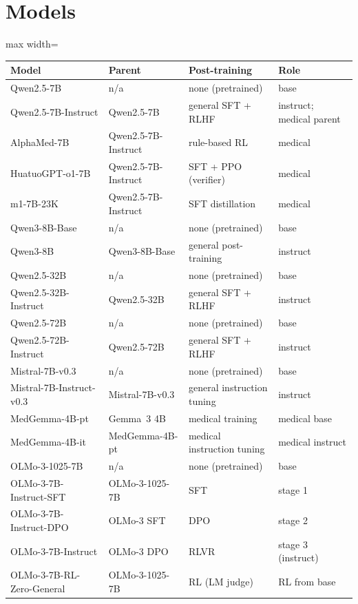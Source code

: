 \documentclass[wcp]{jmlr}
\begin{document}
\section{Models}\label{app:models}
\begin{table}[h]
\centering\small
\begin{adjustbox}{max width=\linewidth}
\begin{tabular}{llll}
\toprule
Model & Parent & Post-training & Role \\
\midrule
Qwen2.5-7B & n/a & none (pretrained) & base \\
Qwen2.5-7B-Instruct & Qwen2.5-7B & general SFT + RLHF & instruct; medical parent \\
AlphaMed-7B~\citep{liu2025alphamed} & Qwen2.5-7B-Instruct & rule-based RL & medical \\
HuatuoGPT-o1-7B~\citep{chen2024huatuogpto1} & Qwen2.5-7B-Instruct & SFT + PPO (verifier) & medical \\
m1-7B-23K~\citep{huang2025m1} & Qwen2.5-7B-Instruct & SFT distillation & medical \\
Qwen3-8B-Base & n/a & none (pretrained) & base \\
Qwen3-8B & Qwen3-8B-Base & general post-training & instruct \\
Qwen2.5-32B & n/a & none (pretrained) & base \\
Qwen2.5-32B-Instruct & Qwen2.5-32B & general SFT + RLHF & instruct \\
Qwen2.5-72B & n/a & none (pretrained) & base \\
Qwen2.5-72B-Instruct & Qwen2.5-72B & general SFT + RLHF & instruct \\
\midrule
Mistral-7B-v0.3 & n/a & none (pretrained) & base \\
Mistral-7B-Instruct-v0.3 & Mistral-7B-v0.3 & general instruction tuning & instruct \\
\midrule
MedGemma-4B-pt & Gemma~3 4B & medical training & medical base \\
MedGemma-4B-it & MedGemma-4B-pt & medical instruction tuning & medical instruct \\
\midrule
OLMo-3-1025-7B~\citep{olmo2025olmo3} & n/a & none (pretrained) & base \\
OLMo-3-7B-Instruct-SFT & OLMo-3-1025-7B & SFT & stage 1 \\
OLMo-3-7B-Instruct-DPO & OLMo-3 SFT & DPO & stage 2 \\
OLMo-3-7B-Instruct & OLMo-3 DPO & RLVR & stage 3 (instruct) \\
OLMo-3-7B-RL-Zero-General & OLMo-3-1025-7B & RL (LM judge) & RL from base \\

\end{tabular}
\end{adjustbox}
\end{table}
\end{document}
